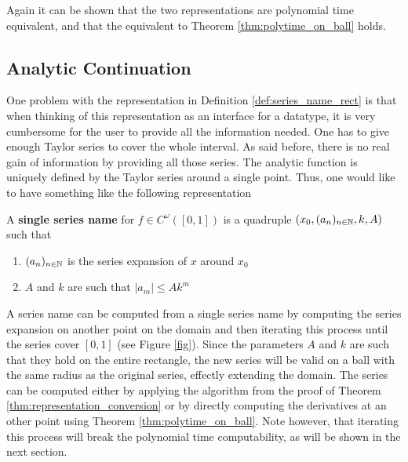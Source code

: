 	Again it can be shown that the two representations are polynomial time equivalent, and that the equivalent to
	Theorem \ref{thm:polytime_on_ball} holds.
	\subsection{Analytic Continuation}
		One problem with the representation in Definition \ref{def:series_name_rect} is that when thinking of this representation as an interface for a datatype, it is very cumbersome for the user to provide all the information needed. 
		One has to give enough Taylor series to cover the whole interval.
		As said before, there is no real gain of information by providing all those series.
		The analytic function is uniquely defined by the Taylor series around a single point.
		Thus, one would like to have something like the following representation
		\begin{definition}
			A \textbf{single series name} for $f \in C^\omega([0,1])$ is a quadruple $(x_0, (a_n)_{n \in \mathbb N}, k, A)$ such that
			\begin{enumerate}
				\item $(a_n)_{n \in \mathbb N}$ is the series expansion of $x$ around $x_0$
				\item $A$ and $k$ are such that $| a_m | \leq Ak^m$ 
			\end{enumerate}
		\end{definition}
		A series name can be computed from a single series name by computing the series expansion on another point on the domain and then iterating this process until the series cover $[0,1]$ (see Figure \ref{fig}).
		Since the parameters $A$ and $k$ are such that they hold on the entire rectangle, 
		the new series will be valid on a ball with the same radius as the original series, effectly extending the domain.
		The series can be computed either by applying the algorithm from the proof of Theorem \ref{thm:representation_conversion} or by directly computing the derivatives at an other point using Theorem \ref{thm:polytime_on_ball}.
		Note however, that iterating this process will break the polynomial time computability, as will be shown in the next
		section.
